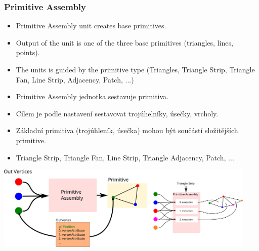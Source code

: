 \begin{frame}
\frametitle{Primitive Assembly}
  \scriptsize
	\begin{itemize}
		\item Primitive Assembly unit creates base primitives.
    \item Output of the unit is one of the three base primitives (triangles, lines, points).
    \item The units is guided by the primitive type (Triangles, Triangle Strip, Triangle Fan, Line Strip, Adjacency, Patch, ...)
	\end{itemize}

	\begin{itemize}
		\item Primitive Assembly jednotka sestavuje primitiva.
    \item Cílem je podle nastavení sestavovat trojúhelníky, úsečky, vrcholy.
    \item Základní primitiva (trojúhleník, úsečka) mohou být součástí složitějších primitive.
    \item Triangle Strip, Triangle Fan, Line Strip, Triangle Adjacency, Patch, ...
	\end{itemize}
	\includegraphics[width=12.5cm,keepaspectratio]{pics/pipeline/PrimitiveAssembly}
\end{frame}


